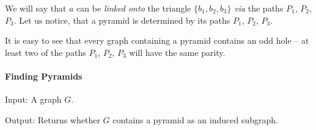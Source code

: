 We will say that $a$ can be \emph{linked onto} the triangle $\{b_1, b_2, b_3\}$ \emph{via} the paths $P_1$, $P_2$, $P_3$. Let us notice, that a pyramid is determined by its paths $P_1$, $P_2$, $P_3$.

It is easy to see that every graph containing a pyramid contains an odd hole -- at least two of the paths $P_1$, $P_2$, $P_3$ will have the same parity.

\paragraph{Finding Pyramids}


\begin{alg}
	\label{alg:testPyramid}
	Input: A graph $G$.

	\noindent Output: Returns whether $G$ contains a pyramid as an induced subgraph.
\end{alg}
